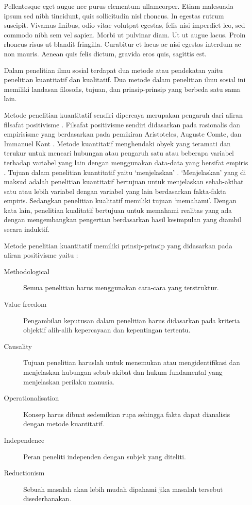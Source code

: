 	\question
Pellentesque eget augue nec purus elementum ullamcorper. Etiam malesuada ipsum sed nibh tincidunt, 
quis sollicitudin nisl rhoncus. In egestas rutrum suscipit. Vivamus finibus, odio vitae volutpat 
egestas, felis nisi imperdiet leo, sed commodo nibh sem vel sapien. Morbi ut pulvinar diam. Ut ut 
augue lacus. Proin rhoncus risus ut blandit fringilla. Curabitur et lacus ac nisi egestas interdum ac 
non mauris. Aenean quis felis dictum, gravida eros quis, sagittis est.
\begin{solution}
	Dalam penelitian ilmu sosial terdapat dua metode atau pendekatan yaitu penelitian kuantitatif dan kualitatif.
	Dua metode dalam penelitian ilmu sosial ini memiliki landasan filosofis, tujuan, dan prinsip-prinsip yang berbeda satu sama lain.
	
	Metode penelitian kuantitatif sendiri dipercaya merupakan pengaruh dari aliran filsafat positivisme \cite{ginting_filsafat_2008,mertens_research_2015,kothari_research_2013}.
	Filsafat positivisme sendiri didasarkan pada rasionalis dan empirisisme yang berdasarkan pada pemikiran Aristoteles, Auguste Comte, dan Immanuel Kant \cite{mertens_research_2015}.
	Metode kuantitatif menghendaki obyek yang teramati dan terukur untuk mencari hubungan atau pengaruh satu atau beberapa variabel terhadap variabel yang lain dengan menggunakan data-data yang bersifat empiris \cite{ginting_filsafat_2008}.
	Tujuan dalam penelitian kuantitatif yaitu `menjelaskan' \cite{ginting_filsafat_2008}.
	`Menjelaskan' yang di maksud adalah penelitian kuantitatif bertujuan untuk menjelaskan sebab-akibat satu atau lebih variabel dengan variabel yang lain berdasarkan fakta-fakta empiris. Sedangkan penelitian kualitatif memiliki tujuan `memahami'. Dengan kata lain, penelitian kualitatif bertujuan untuk memahami realitas yang ada dengan mengembangkan pengertian berdasarkan hasil kesimpulan yang diambil secara induktif.
	
	Metode penelitian kuantitatif memiliki prinsip-prinsip yang didasarkan pada aliran positivisme yaitu \cite{crossan_research_2003}:
	\begin{description}
		\item[Methodological] Semua penelitian harus menggunakan cara-cara yang terstruktur.
		\item[Value-freedom] Pengambilan keputusan dalam penelitian harus didasarkan pada kriteria objektif alih-alih kepercayaan dan kepentingan tertentu.
		\item[Causality] Tujuan penelitian haruslah untuk menemukan atau mengidentifikasi dan menjelaskan hubungan sebab-akibat dan hukum fundamental yang menjelaskan perilaku manusia.
		\item[Operationalisation] Konsep harus dibuat sedemikian rupa sehingga fakta dapat dianalisis dengan metode kuantitatif.
		\item[Independence] Peran peneliti independen dengan subjek yang diteliti.
		\item[Reductionism] Sebuah masalah akan lebih mudah dipahami jika masalah tersebut disederhanakan.
	\end{description}
	

\end{solution}
